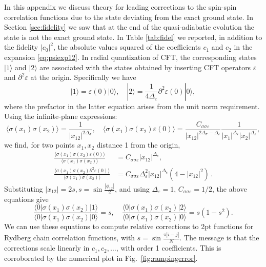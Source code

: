 \documentclass[a4paper,11pt]{article}
\theoremstyle{remark}
\theoremstyle{theorem}
\begin{document}
In this appendix we discuss theory for leading corrections to the spin-spin
correlation functions due to the state deviating from the exact ground state.
In Section \ref{sec:fidelity} we saw that at the end of the quasi-adiabatic evolution the
state is not the exact ground state. In Table \ref{tab:fidel} we reported, in addition
to the fidelity $| c_0 |^2$, the absolute values squared of the coefficients
$c_1$ and $c_2$ in the expansion \eqref{eq:psiexp12}. In radial quantization of CFT, the
corresponding states $| 1 \rangle $ and $| 2 \rangle $ are associated with
the states obtained by inserting CFT operators $\varepsilon$ and $\partial^2
\varepsilon$ at the origin. Specifically we have
\begin{equation}
	| 1 \rangle  = \varepsilon (0) | 0 \rangle , \quad | 2 \rangle  = \frac{1}{4
		\Delta_{\varepsilon}} \partial^2 \varepsilon (0) | 0 \rangle ,
\end{equation}
where the prefactor in the latter equation arises from the unit
norm requirement. Using the infinite-plane expressions:
\begin{equation}
	\langle \sigma (x_1) \sigma (x_2) \rangle = \frac{1}{| x_{12} |^{2
			\Delta_{\sigma}}}, \quad \langle \sigma (x_1) \sigma (x_2) \varepsilon (0)
	\rangle = \frac{C_{\sigma \sigma \varepsilon}}{| x_{12} |^{2 \Delta_{\sigma}
			- \Delta_{\varepsilon}}} \frac{1}{| x_1 |^{\Delta_{\varepsilon}} | x_2
		|^{\Delta_{\varepsilon}}},
\end{equation}
we find, for two points $x_1, x_2$ distance 1 from the origin,
\begin{align}
	\frac{\langle \sigma (x_1) \sigma (x_2) \varepsilon (0) \rangle}{\langle
		\sigma (x_1) \sigma (x_2) \rangle} &= C_{\sigma \sigma \varepsilon} | x_{12}
	|^{\Delta_e}, \\
	\frac{\langle \sigma (x_1) \sigma (x_2) \partial^2 \varepsilon (0)
		\rangle}{\langle \sigma (x_1) \sigma (x_2) \rangle} &= C_{\sigma \sigma
		\varepsilon} \Delta_{\varepsilon}^2 | x_{12} |^{\Delta_e} (4 - | x_{12} |^2)\,.
\end{align}
Substituting $| x_{12} | = 2 s, s = \sin \frac{| \phi_{12} |}{2}$, and
using $\Delta_{\varepsilon} = 1$, $C_{\sigma \sigma \varepsilon} = 1 / 2$, the
above equations give
\begin{equation}
	\frac{\langle 0 |  \sigma (x_1) \sigma (x_2) |  1 \rangle}{\langle 0 | 
		\sigma (x_1) \sigma (x_2) |  0 \rangle} = s, \quad \frac{\langle 0 |  \sigma
		(x_1) \sigma (x_2) |  2 \rangle}{\langle 0 |  \sigma (x_1) \sigma (x_2) |  0
		\rangle} = s (1 - s^2) .
\end{equation}
We can use these equations to compute relative corrections to 2pt functions for Rydberg
chain correlation functions, with $s = \sin \frac{\pi | i - j |}{N}$. The
message is that the corrections scale linearly in $c_1, c_2,
\ldots$, with order 1 coefficients. This is corroborated by the numerical
plot in Fig.~\ref{fig:rampingerror}.
	

\small
\setlength{\bibsep}{2pt}

\end{document}
